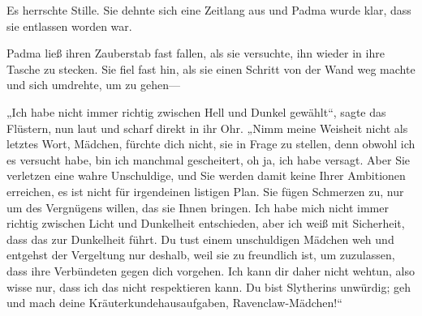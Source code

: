 Es herrschte Stille. Sie dehnte sich eine Zeitlang aus und Padma wurde klar, dass sie entlassen worden war.

Padma ließ ihren Zauberstab fast fallen, als sie versuchte, ihn wieder in ihre Tasche zu stecken. Sie fiel fast hin, als sie einen Schritt von der Wand weg machte und sich umdrehte, um zu gehen—

„Ich habe nicht immer richtig zwischen Hell und Dunkel gewählt“, sagte das Flüstern, nun laut und scharf direkt in ihr Ohr. „Nimm meine Weisheit nicht als letztes Wort, Mädchen, fürchte dich nicht, sie in Frage zu stellen, denn obwohl ich es versucht habe, bin ich manchmal gescheitert, oh ja, ich habe versagt. Aber Sie verletzen eine wahre Unschuldige, und Sie werden damit keine Ihrer Ambitionen erreichen, es ist nicht für irgendeinen listigen Plan. Sie fügen Schmerzen zu, nur um des Vergnügens willen, das sie Ihnen bringen. Ich habe mich nicht immer richtig zwischen Licht und Dunkelheit entschieden, aber ich weiß mit Sicherheit, dass das zur Dunkelheit führt. Du tust einem unschuldigen Mädchen weh und entgehst der Vergeltung nur deshalb, weil sie zu freundlich ist, um zuzulassen, dass ihre Verbündeten gegen dich vorgehen. Ich kann dir daher nicht wehtun, also wisse nur, dass ich das nicht respektieren kann. Du bist Slytherins unwürdig; geh und mach deine Kräuterkundehausaufgaben, Ravenclaw-Mädchen!“

